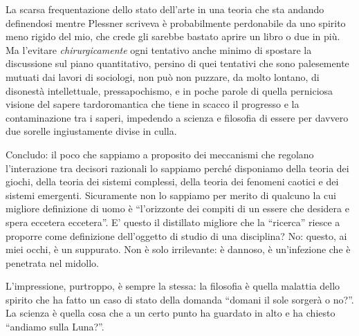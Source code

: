 \documentclass[dvipsnames]{amsart}
\begin{document}
La scarsa frequentazione dello stato dell'arte in una teoria che sta andando definendosi mentre Plessner scriveva è probabilmente perdonabile da uno spirito meno rigido del mio, che crede gli sarebbe bastato aprire un libro o due in più. Ma l'evitare \emph{chirurgicamente} ogni tentativo anche minimo di spostare la discussione sul piano quantitativo, persino di quei tentativi che sono palesemente mutuati dai lavori di sociologi, non può non puzzare, da molto lontano, di disonestà intellettuale, pressapochismo, e in poche parole di quella perniciosa visione del sapere tardoromantica che tiene in scacco il progresso e la contaminazione tra i saperi, impedendo a scienza e filosofia di essere per davvero due sorelle ingiustamente divise in culla.

Concludo: il poco che sappiamo a proposito dei meccanismi che regolano l'interazione tra decisori razionali lo sappiamo perché disponiamo della teoria dei giochi, della teoria dei sistemi complessi, della teoria dei fenomeni caotici e dei sistemi emergenti. Sicuramente non lo sappiamo per merito di qualcuno la cui migliore definizione di uomo è ``l'orizzonte dei compiti di un essere che desidera e spera eccetera eccetera''. E' questo il distillato migliore che la ``ricerca'' riesce a proporre come definizione dell'oggetto di studio di una disciplina? No: questo, ai miei occhi, è un suppurato. Non è solo irrilevante: è dannoso, è un'infezione che è penetrata nel midollo. %

L'impressione, purtroppo, è sempre la stessa: la filosofia è quella malattia dello spirito che ha fatto un caso di stato della domanda ``domani il sole sorgerà o no?''. La scienza è quella cosa che a un certo punto ha guardato in alto e ha chiesto ``andiamo sulla Luna?''.



\end{document}
